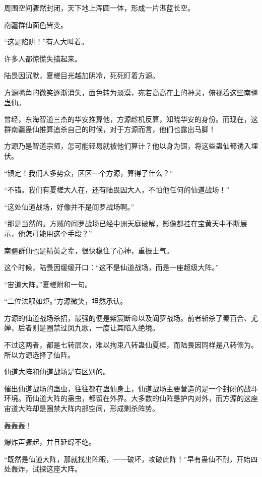 
\begin{this_body}

周围空间骤然封闭，天下地上浑圆一体，形成一片湛蓝长空。

南疆群仙面色皆变。

“这是陷阱！”有人大叫着。

许多人都惊慌失措起来。

陆畏因沉默，夏槎目光越加阴冷，死死盯着方源。

方源嘴角的微笑逐渐消失，面色转为淡漠，宛若高高在上的神灵，俯视着这些南疆蛊仙。

曾经，东海智道三杰的华安推算他，方源趁机反算，知晓华安的身份。而现在，这群南疆蛊仙推算追杀自己的时候，对于方源而言，他们也露出马脚！

方源乃是智道宗师，怎可能轻易就被他们算计？他以身为饵，将这些蛊仙都诱入埋伏。

“镇定！我们人多势众，区区一个方源，算得了什么？”

“不错。我们有夏槎大人在，还有陆畏因大人，不怕他任何的仙道战场！”

“这处仙道战场，好像并不是阎罗战场啊。”

“那是当然的。方贼的阎罗战场已经中洲天庭破解，影像都挂在宝黄天中不断展示，他怎可能用这个手段？”

南疆群仙也是精英之辈，很快稳住了心神，重振士气。

这个时候，陆畏因缓缓开口：“这不是仙道战场，而是一座超级大阵。”

“宙道大阵。”夏槎附和一句。

“二位法眼如炬。”方源微笑，坦然承认。

方源的仙道战场杀招，最强的便是紫宸断命以及阎罗战场。前者斩杀了秦百合、尤婵，后者则是圈禁过凤九歌，一度让其陷入绝境。

不过这两者，都是七转层次，难以拘束八转蛊仙夏槎，而陆畏因同样是八转修为。所以方源选择了仙阵。

仙道大阵和仙道战场是有区别的。

催出仙道战场的蛊虫，往往都在蛊仙身上，仙道战场主要营造的是一个封闭的战斗环境。而仙道大阵的蛊虫，都留在外界。大多数的仙阵是护内对外，而方源的这座宙道大阵却是圈禁大阵内部空间，形成剿杀阵势。

轰轰轰！

爆炸声骤起，并且延绵不绝。

“既然是仙道大阵，那就找出阵眼，一一破坏，攻破此阵！”早有蛊仙不耐，开始四处轰炸，试探这座大阵。


\end{this_body}
